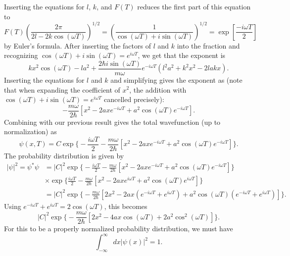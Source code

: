 Inserting the equations for $l$, $k$, and $F(T)$ reduces the first part of this equation to 
\begin{equation}
    F(T)\left (\frac{2\pi}{2l-2k\cos(\omega T)} \right )^{1/2}=\left (\frac{1}{\cos(\omega T)+i\sin(\omega T)}\right )^{1/2}=\exp[\frac{-i\omega T}2]
\end{equation}
by Euler's formula. After inserting the factors of $l$ and $k$ into the fraction and recognizing $\cos(\omega T)+i\sin(\omega T)=e^{i\omega T}$, we get that the exponent is 
\begin{equation}
    kx^2\cos(\omega T)-la^2+\frac{2\hbar i \sin(\omega T)}{m \omega}e^{-i\omega T}(l^2a^2+k^2x^2-2lakx).
\end{equation}
Inserting the equations for $l$ and $k$ and simplifying gives the exponent as (note that when expanding the coefficient of $x^2$, the addition with $\cos(\omega T)+i\sin(\omega T)=e^{i\omega T}$ cancelled precisely):
\begin{equation}
    -\frac{m\omega}{2\hbar}[x^2-2axe^{-i\omega T}+a^2\cos(\omega T)e^{-i\omega T}].
\end{equation}
Combining with our previous result gives the total wavefunction (up to normalization) as 
\begin{equation}
    \psi(x,T)=C\exp \Bigg \{ -\frac{i\omega T}2-\frac{m\omega}{2\hbar}[x^2-2axe^{-i\omega T}+a^2\cos(\omega T)e^{-i\omega T}]\Bigg\}.
\end{equation}
The probability distribution is given by
\begin{align}
    |\psi|^2=\psi^*\psi&=|C|^2\exp \Bigg \{ -\frac{i\omega T}2-\frac{m\omega}{2\hbar}[x^2-2axe^{-i\omega T}+a^2\cos(\omega T)e^{-i\omega T}]\Bigg\} \\ &\times \exp \Bigg \{ \frac{i\omega T}2-\frac{m\omega}{2\hbar}[x^2-2axe^{i\omega T}+a^2\cos(\omega T)e^{i\omega T}]\Bigg\}\\
    &= |C|^2\exp \Bigg \{ -\frac{m\omega}{2\hbar}[2x^2-2ax(e^{-i\omega T}+e^{i\omega T})+a^2\cos(\omega T)(e^{-i\omega T}+e^{i\omega T})]\Bigg\}.
\end{align}
Using $e^{-i\omega T}+e^{i\omega T}=2\cos(\omega T)$, this becomes
\begin{equation}
    |C|^2\exp \Bigg \{ -\frac{m\omega}{2\hbar}[2x^2-4ax\cos(\omega T)+2a^2\cos^2(\omega T)]\Bigg\}.
\end{equation}
For this to be a properly normalized probability distribution, we must have
\begin{equation}
    \int_{-\infty}^{\infty}dx|\psi(x)|^2=1.
\end{equation}
